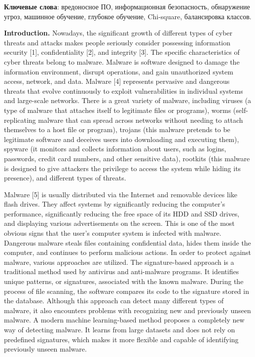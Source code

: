 {\bfseries Ключевые слова}: вредоносное ПО, информационная безопасность,
обнаружение угроз, машинное обучение, глубокое обучение, Chi-square,
балансировка классов.

\begin{multicols}{2}
{\bfseries Introduction.} Nowadays, the significant growth of different
types of cyber threats and attacks makes people seriously consider
possessing information security {[}1{]}, confidentiality {[}2{]}, and
integrity {[}3{]}. The specific characteristics of cyber threats belong
to malware. Malware is software designed to damage the information
environment, disrupt operations, and gain unauthorized system access,
network, and data. Malware {[}4{]} represents pervasive and dangerous
threats that evolve continuously to exploit vulnerabilities in
individual systems and large-scale networks. There is a great variety of
malware, including viruses (a type of malware that attaches itself to
legitimate files or programs), worms (self-replicating malware that can
spread across networks without needing to attach themselves to a host
file or program), trojans (this malware pretends to be legitimate
software and deceives users into downloading and executing them),
spyware (it monitors and collects information about users, such as
logins, passwords, credit card numbers, and other sensitive data),
rootkits (this malware is designed to give attackers the privilege to
access the system while hiding its presence), and different types of
threats.

Malware {[}5{]} is usually distributed via the Internet and removable
devices like flash drives. They affect systems by significantly reducing
the computer's performance, significantly reducing the free space of its
HDD and SSD drives, and displaying various advertisements on the screen.
This is one of the most obvious signs that the user's computer system is
infected with malware. Dangerous malware steals files containing
confidential data, hides them inside the computer, and continues to
perform malicious actions. In order to protect against malware, various
approaches are utilized. The signature-based approach is a traditional
method used by antivirus and anti-malware programs. It identifies unique
patterns, or signatures, associated with the known malware. During the
process of file scanning, the software compares its code to the
signature stored in the database. Although this approach can detect many
different types of malware, it also encounters problems with recognizing
new and previously unseen malware. A modern machine learning-based
method proposes a completely new way of detecting malware. It learns
from large datasets and does not rely on predefined signatures, which
makes it more flexible and capable of identifying previously unseen
malware.


\end{multicols}
